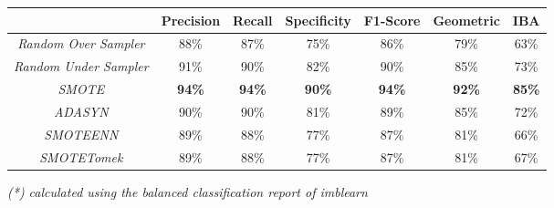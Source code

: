 \begin{table}[H]
	\centering
	\begin{tabular}{@{}ccccccc@{}}
		\toprule
		& \textbf{Precision} & \textbf{Recall} & \textbf{Specificity} & \textbf{F1-Score} & \textbf{Geometric} & \textbf{IBA}  \\ \midrule
		\textit{Random Over Sampler}  & 88\%               & 87\%            & 75\%                 & 86\%              & 79\%               & 63\%          \\
		\textit{Random Under Sampler} & 91\%               & 90\%            & 82\%                 & 90\%              & 85\%               & 73\%          \\
		\textit{SMOTE}                & \textbf{94\%}      & \textbf{94\%}   & \textbf{90\%}        & \textbf{94\%}     & \textbf{92\%}      & \textbf{85\%} \\
		\textit{ADASYN}               & 90\%               & 90\%            & 81\%                 & 89\%              & 85\%               & 72\%          \\
		\textit{SMOTEENN}             & 89\%               & 88\%            & 77\%                 & 87\%              & 81\%               & 66\%          \\
		\textit{SMOTETomek}           & 89\%               & 88\%            & 77\%                 & 87\%              & 81\%               & 67\%          \\ \bottomrule
	\end{tabular}
\end{table}

\textit{(*) calculated using the balanced classification report of imblearn}


